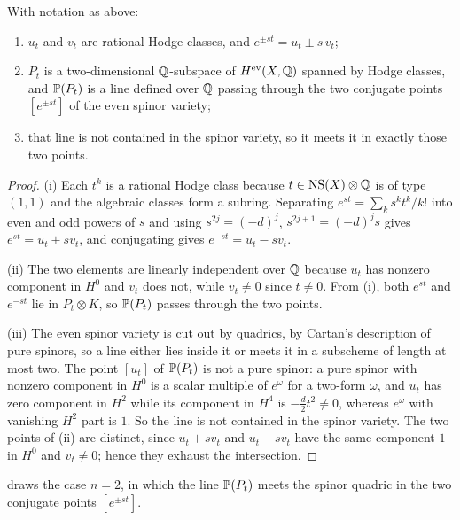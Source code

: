 \begin{theorem}\label{thm:plane}
With notation as above:
\begin{enumerate}[label=\textup{(\roman*)}]
\item $u_{t}$ and $v_{t}$ are rational Hodge classes, and
  $e^{\pm st}=u_{t}\pm s\,v_{t}$;
\item $P_{t}$ is a two-dimensional $\mathbb{Q}$-subspace of $H^{\mathrm{ev}}(X,\mathbb{Q})$
  spanned by Hodge classes, and $\mathbb{P}(P_{t})$ is a line defined over $\mathbb{Q}$
  passing through the two conjugate points $[e^{\pm st}]$ of the even spinor
  variety;
\item that line is not contained in the spinor variety, so it meets it in
  exactly those two points.
\end{enumerate}
\end{theorem}

\begin{proof}
(i) Each $t^{k}$ is a rational Hodge class because $t\in\mathrm{NS}(X)\otimes\mathbb{Q}$ is
of type $(1,1)$ and the algebraic classes form a subring. Separating
$e^{st}=\sum_{k}s^{k}t^{k}/k!$ into even and odd powers of $s$ and using
$s^{2j}=(-d)^{j}$, $s^{2j+1}=(-d)^{j}s$ gives $e^{st}=u_{t}+sv_{t}$, and
conjugating gives $e^{-st}=u_{t}-sv_{t}$.

(ii) The two elements are linearly independent over $\mathbb{Q}$ because $u_{t}$ has
nonzero component in $H^{0}$ and $v_{t}$ does not, while $v_{t}\ne0$ since
$t\ne0$. From (i), both $e^{st}$ and $e^{-st}$ lie in $P_{t}\otimes K$, so
$\mathbb{P}(P_{t})$ passes through the two points.

(iii) The even spinor variety is cut out by quadrics, by Cartan's description
of pure spinors, so a line either lies inside it or meets it in a subscheme of
length at most two. The point $[u_{t}]$ of $\mathbb{P}(P_{t})$ is not a pure spinor:
a pure spinor with nonzero component in $H^{0}$ is a scalar multiple of
$e^{\omega}$ for a two-form $\omega$, and $u_{t}$ has zero component in
$H^{2}$ while its component in $H^{4}$ is $-\tfrac{d}{2}t^{2}\ne0$, whereas
$e^{\omega}$ with vanishing $H^{2}$ part is $1$. So the line is not contained
in the spinor variety. The two points of (ii) are distinct, since
$u_{t}+sv_{t}$ and $u_{t}-sv_{t}$ have the same component $1$ in $H^{0}$ and
$v_{t}\ne0$; hence they exhaust the intersection.
\end{proof}

 draws the case $n=2$, in which the line $\mathbb{P}(P_{t})$
meets the spinor quadric in the two conjugate points $[e^{\pm st}]$.

